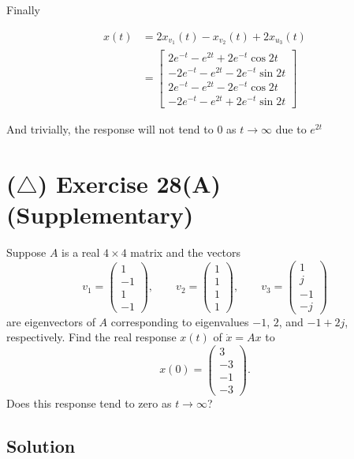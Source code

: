 \documentclass[12pt,a4paper]{article}
\begin{document}
Finally 

\begin{align*}
	x(t) &= 2x_{v_1}(t) - x_{v_2}(t) + 2x_{u_3} (t) \\
	&= \begin{bmatrix}
		2e^{-t} - e^{2t} + 2e^{-t}\cos 2t \\
		-2e^{-t} - e^{2t} - 2e^{-t}\sin 2t \\
		2e^{-t} - e^{2t} - 2e^{-t} \cos 2t \\
		-2e^{-t} - e^{2t} + 2e^{-t}\sin 2t 
	\end{bmatrix}
\end{align*}

And trivially, 
the response will not tend to $0$ as $t\to\infty$ due to $e^{2t}$

\vspace{1cm}
\section*{($\triangle$) Exercise 28(A) \hfill {\normalsize (Supplementary)}}
Suppose $A$ is a real $4\times4$ matrix and the vectors
\[
v_1=\begin{pmatrix}1\\-1\\1\\-1\end{pmatrix},\qquad
v_2=\begin{pmatrix}1\\1\\1\\1\end{pmatrix},\qquad
v_3=\begin{pmatrix}1\\j\\-1\\-j\end{pmatrix}
\]
are eigenvectors of $A$ corresponding to eigenvalues $-1$, $2$, and
$-1+2j$, respectively. Find the real response $x(t)$ of $\dot x=Ax$ to
\[
x(0)=\begin{pmatrix}3\\-3\\-1\\-3\end{pmatrix}.
\]
Does this response tend to zero as $t\to\infty$?

\subsection*{Solution}
\end{document}
